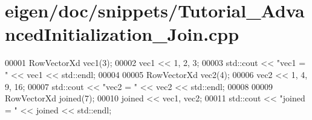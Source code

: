 \hypertarget{eigen_2doc_2snippets_2_tutorial___advanced_initialization___join_8cpp_source}{}\section{eigen/doc/snippets/\+Tutorial\+\_\+\+Advanced\+Initialization\+\_\+\+Join.cpp}
\label{eigen_2doc_2snippets_2_tutorial___advanced_initialization___join_8cpp_source}

\begin{DoxyCode}
00001 RowVectorXd vec1(3);
00002 vec1 << 1, 2, 3;
00003 std::cout << \textcolor{stringliteral}{"vec1 = "} << vec1 << std::endl;
00004 
00005 RowVectorXd vec2(4);
00006 vec2 << 1, 4, 9, 16;
00007 std::cout << \textcolor{stringliteral}{"vec2 = "} << vec2 << std::endl;
00008 
00009 RowVectorXd joined(7);
00010 joined << vec1, vec2;
00011 std::cout << \textcolor{stringliteral}{"joined = "} << joined << std::endl;
\end{DoxyCode}
